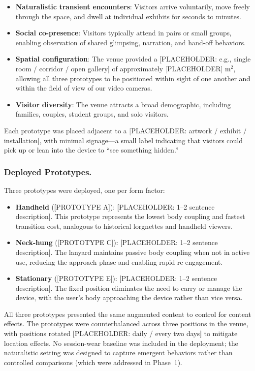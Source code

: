 \begin{itemize}
    \item \textbf{Naturalistic transient encounters}: Visitors arrive voluntarily, move freely through the space, and dwell at individual exhibits for seconds to minutes.
    \item \textbf{Social co-presence}: Visitors typically attend in pairs or small groups, enabling observation of shared glimpsing, narration, and hand-off behaviors.
    \item \textbf{Spatial configuration}: The venue provided a [PLACEHOLDER: e.g., single room / corridor / open gallery] of approximately [PLACEHOLDER] m$^2$, allowing all three prototypes to be positioned within sight of one another and within the field of view of our video cameras.
    \item \textbf{Visitor diversity}: The venue attracts a broad demographic, including families, couples, student groups, and solo visitors.
\end{itemize}

Each prototype was placed adjacent to a [PLACEHOLDER: artwork / exhibit / installation], with minimal signage---a small label indicating that visitors could pick up or lean into the device to ``see something hidden.''

\subsubsection{Deployed Prototypes.}
Three prototypes were deployed, one per form factor:

\begin{itemize}
    \item \textbf{Handheld} ([PROTOTYPE A]): [PLACEHOLDER: 1--2 sentence description]. This prototype represents the lowest body coupling and fastest transition cost, analogous to historical lorgnettes and handheld viewers.
    \item \textbf{Neck-hung} ([PROTOTYPE C]): [PLACEHOLDER: 1--2 sentence description]. The lanyard maintains passive body coupling when not in active use, reducing the approach phase and enabling rapid re-engagement.
    \item \textbf{Stationary} ([PROTOTYPE E]): [PLACEHOLDER: 1--2 sentence description]. The fixed position eliminates the need to carry or manage the device, with the user's body approaching the device rather than vice versa.
\end{itemize}

All three prototypes presented the same augmented content to control for content effects. The prototypes were counterbalanced across three positions in the venue, with positions rotated [PLACEHOLDER: daily / every two days] to mitigate location effects. No session-wear baseline was included in the deployment; the naturalistic setting was designed to capture emergent behaviors rather than controlled comparisons (which were addressed in Phase~1).

